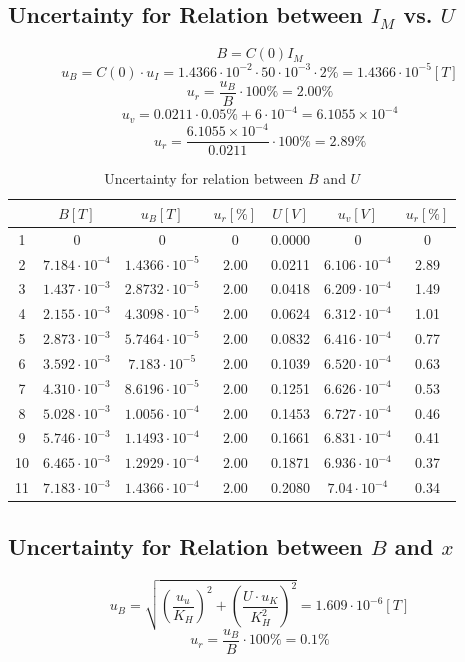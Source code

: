 \documentclass[12pt]{article}
\begin{document}
\subsection{Uncertainty for Relation between $I_M$ vs. $U$}
$$B=C(0)I_M$$
$$u_B=C(0)\cdot u_I=1.4366\cdot10^{-2}\cdot50\cdot10^{-3}\cdot2\%=1.4366\cdot10^{-5}[T]$$
$$u_r=\frac{u_B}{B}\cdot100\%=2.00\%$$
$$u_v=0.0211\cdot0.05\%+6\cdot10^{-4}=6.1055\times10^{-4}$$
$$u_r=\frac{6.1055\times10^{-4}}{0.0211}\cdot100\%=2.89\%$$
\begin{table}[H]
\centering
\begin{tabular}{|c|c|c|c|c|c|c|}
\hline
  &$B[T]$&$u_B[T]$&$u_r[\%]$&$U[V]$&$u_v[V]$&$u_r[\%]$  \\ \hline
1 &0&0&0    &0.0000&0&0  \\ \hline
2 &$7.184\cdot10^{-4}$&$1.4366\cdot10^{-5}$&$2.00$&0.0211&$6.106\cdot10^{-4}$&2.89  \\ \hline
3 &$1.437\cdot10^{-3}$&$2.8732\cdot10^{-5}$&$2.00$  &0.0418&$6.209\cdot10^{-4}$&1.49  \\ \hline
4 &$2.155\cdot10^{-3}$&$4.3098\cdot10^{-5}$&$2.00$  &0.0624&$6.312\cdot10^{-4}$&1.01  \\ \hline
5 &$2.873\cdot10^{-3}$&$5.7464\cdot10^{-5}$&$2.00$  &0.0832&$6.416\cdot10^{-4}$&0.77  \\ \hline
6 &$3.592\cdot10^{-3}$&$7.183\cdot10^{-5}$&$2.00$   &0.1039&$6.520\cdot10^{-4}$&0.63  \\ \hline
7 &$4.310\cdot10^{-3}$&$8.6196\cdot10^{-5}$&$2.00$  &0.1251&$6.626\cdot10^{-4}$&0.53  \\ \hline
8 &$5.028\cdot10^{-3}$&$1.0056\cdot10^{-4}$&$2.00$  &0.1453&$6.727\cdot10^{-4}$&0.46  \\ \hline
9 &$5.746\cdot10^{-3}$&$1.1493\cdot10^{-4}$&$2.00$  &0.1661&$6.831\cdot10^{-4}$&0.41  \\ \hline
10&$6.465\cdot10^{-3}$&$1.2929\cdot10^{-4}$&$2.00$  &0.1871&$6.936\cdot10^{-4}$&0.37  \\ \hline
11&$7.183\cdot10^{-3}$&$1.4366\cdot10^{-4}$&$2.00$  &0.2080&$7.04\cdot10^{-4}$&0.34 \\ \hline
\end{tabular}
\caption{Uncertainty for relation between $B$ and $U$}
\end{table}
\subsection{Uncertainty for Relation between $B$ and $x$}
$$u_B=\sqrt{(\frac{u_u}{K_H})^2+(\frac{U\cdot u_K}{K_H^2})^2}=1.609\cdot10^{-6}[T]$$
$$u_r=\frac{u_B}{B}\cdot100\%=0.1\%$$
\end{document}
